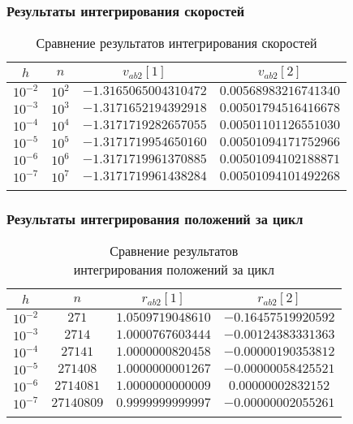 \begin{frame}
\frametitle{Результаты интегрирования скоростей}

\begin{table}[h]
  \centering
  \caption{Сравнение результатов интегрирования скоростей}
  \begin{tabular}{cccc}
    \toprule
    $ h $ &
    $ n $ &
    $ v_{ab2}[1] $ &
    $ v_{ab2}[2] $ \\
    \midrule
    $ 10^{-2} $ & $ 10^2 $ & $ -1.3165065004310472 $ & $ 0.00568983216741340 $ \\
    \arrayrulecolor{black!40}
    \midrule
    $ 10^{-3} $ & $ 10^3 $ & $ -1.3171652194392918 $ & $ 0.00501794516416678 $ \\
    \midrule
    $ 10^{-4} $ & $ 10^4 $ & $ -1.3171719282657055 $ & $ 0.00501101126551030 $ \\
    \midrule
    $ 10^{-5} $ & $ 10^5 $ & $ -1.3171719954650160 $ & $ 0.00501094171752966 $ \\
    \midrule
    $ 10^{-6} $ & $ 10^6 $ & $ -1.3171719961370885 $ & $ 0.00501094102188871 $ \\
    \midrule
    $ 10^{-7} $ & $ 10^7 $ & $ -1.3171719961438284 $ & $ 0.00501094101492268 $ \\
    \arrayrulecolor{black}
    \bottomrule
  \end{tabular}
\end{table}

\end{frame}

\begin{frame}
\frametitle{Результаты интегрирования положений за цикл}

\begin{table}[h]
  \centering
  \caption{Сравнение результатов \\ интегрирования положений за цикл}
  \begin{tabular}{cccc}
    \toprule
    $ h $ &
    $ n $ &
    $ r_{ab2}[1] $ &
    $ r_{ab2}[2] $ \\
    \midrule
    $ 10^{-2} $ & $ 271 $ & $ 1.0509719048610 $ & $ -0.16457519920592 $ \\
    \arrayrulecolor{black!40}
    \midrule
    $ 10^{-3} $ & $ 2714 $ & $ 1.0000767603444 $ & $ -0.00124383331363 $ \\
    \midrule
    $ 10^{-4} $ & $ 27141 $ & $ 1.0000000820458 $ & $ -0.00000190353812 $ \\
    \midrule
    $ 10^{-5} $ & $ 271408 $ & $ 1.0000000001267 $ & $ -0.00000058425521 $ \\
    \midrule
    $ 10^{-6} $ & $ 2714081 $ & $ 1.0000000000009 $ & $ 0.00000002832152 $ \\
    \midrule
    $ 10^{-7} $ & $ 27140809 $ & $ 0.9999999999997 $ & $ -0.00000002055261 $ \\
    \arrayrulecolor{black}
    \bottomrule
  \end{tabular}
\end{table}

\end{frame}

